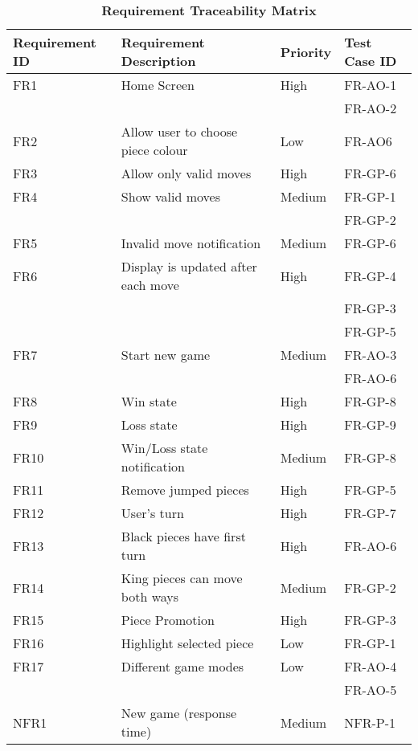 \documentclass[12pt, titlepage]{article}
\begin{document}
\begin{table}[h!]
    \begin{center}
	\caption{\bf Requirement Traceability Matrix}
	\begin{adjustwidth}{-1.5cm}{}
	\begin{tabularx}{1.2\textwidth}{|p{3.4cm}|p{7cm}|p{1.6cm}|X|}
		\hline 
		{\bf Requirement ID}  & {\bf Requirement Description} & {\bf Priority} & {\bf Test Case ID} \\
		\hline
		FR1 & Home Screen & High & FR-AO-1\\
		& & & FR-AO-2\\
		\hline
		FR2 & Allow user to choose piece colour & Low & FR-AO6\\
		\hline
		FR3 & Allow only valid moves & High & FR-GP-6\\
		\hline
		FR4 & Show valid moves & Medium & FR-GP-1\\
		& & & FR-GP-2\\
		\hline
		FR5 & Invalid move notification & Medium & FR-GP-6\\
		\hline
		FR6 & Display is updated after each move & High & FR-GP-4\\
		& & & FR-GP-3\\
		& & & FR-GP-5\\
		\hline
		FR7 & Start new game & Medium & FR-AO-3\\
		& & & FR-AO-6\\
		\hline
		FR8 & Win state & High & FR-GP-8 \\
		\hline
		FR9 & Loss state & High & FR-GP-9 \\
		\hline
		FR10 & Win/Loss state notification & Medium & FR-GP-8 \\
		\hline
		FR11 & Remove jumped pieces & High & FR-GP-5\\
		\hline
		FR12 & User's turn & High & FR-GP-7\\
		\hline
		FR13 & Black pieces have first turn & High &  FR-AO-6\\
		\hline
		FR14 & King pieces can move both ways & Medium & FR-GP-2\\
		\hline
		FR15 & Piece Promotion & High & FR-GP-3\\
		\hline
		FR16 & Highlight selected piece & Low & FR-GP-1\\
		\hline
		FR17 & Different game modes & Low & FR-AO-4\\
	     &  &  & FR-AO-5\\
		\hline
		\hline
		NFR1 & New game (response time) & Medium & NFR-P-1 \\

\end{tabularx}
\end{adjustwidth}
\end{center}
\end{table}
\end{document}
